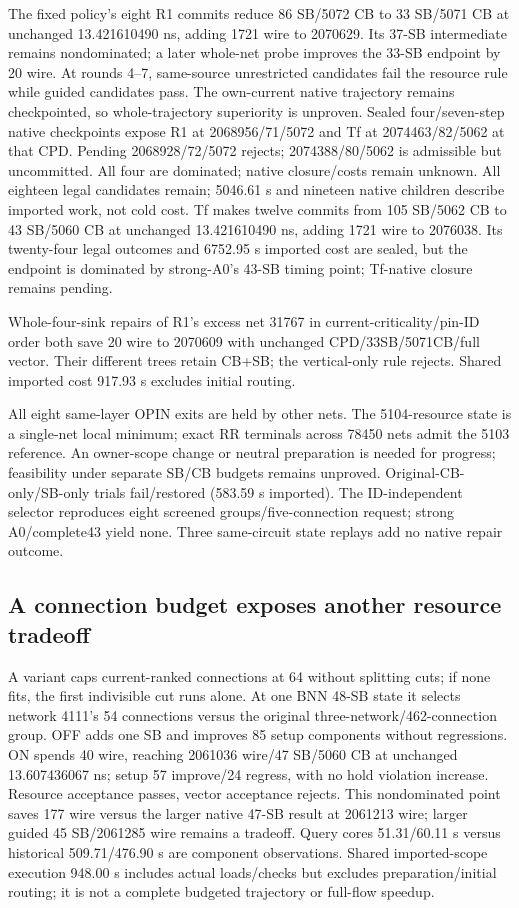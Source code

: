 \documentclass[conference,10pt]{IEEEtran}
\begin{document}
The fixed policy's eight R1 commits reduce 86 SB/5072 CB to 33 SB/5071 CB at unchanged 13.421610490 ns, adding 1721 wire to 2070629. Its 37-SB intermediate remains nondominated; a later whole-net probe improves the 33-SB endpoint by 20 wire. At rounds 4--7, same-source unrestricted candidates fail the resource rule while guided candidates pass. The own-current native trajectory remains checkpointed, so whole-trajectory superiority is unproven. Sealed four/seven-step native checkpoints expose R1 at 2068956/71/5072 and Tf at 2074463/82/5062 at that CPD. Pending 2068928/72/5072 rejects; 2074388/80/5062 is admissible but uncommitted. All four are dominated; native closure/costs remain unknown. All eighteen legal candidates remain; 5046.61 s and nineteen native children describe imported work, not cold cost. Tf makes twelve commits from 105 SB/5062 CB to 43 SB/5060 CB at unchanged 13.421610490 ns, adding 1721 wire to 2076038. Its twenty-four legal outcomes and 6752.95 s imported cost are sealed, but the endpoint is dominated by strong-A0's 43-SB timing point; Tf-native closure remains pending.

Whole-four-sink repairs of R1's excess net 31767 in current-criticality/pin-ID order both save 20 wire to 2070609 with unchanged CPD/33SB/5071CB/full vector. Their different trees retain CB+SB; the vertical-only rule rejects. Shared imported cost 917.93 s excludes initial routing.

All eight same-layer OPIN exits are held by other nets. The 5104-resource state is a single-net local minimum; exact RR terminals across 78450 nets admit the 5103 reference. An owner-scope change or neutral preparation is needed for progress; feasibility under separate SB/CB budgets remains unproved. Original-CB-only/SB-only trials fail/restored (583.59 s imported). The ID-independent selector reproduces eight screened groups/five-connection request; strong A0/complete43 yield none. Three same-circuit state replays add no native repair outcome.

\subsection{A connection budget exposes another resource tradeoff}
A variant caps current-ranked connections at 64 without splitting cuts; if none fits, the first indivisible cut runs alone. At one BNN 48-SB state it selects network 4111's 54 connections versus the original three-network/462-connection group. OFF adds one SB and improves 85 setup components without regressions. ON spends 40 wire, reaching 2061036 wire/47 SB/5060 CB at unchanged 13.607436067 ns; setup 57 improve/24 regress, with no hold violation increase. Resource acceptance passes, vector acceptance rejects. This nondominated point saves 177 wire versus the larger native 47-SB result at 2061213 wire; larger guided 45 SB/2061285 wire remains a tradeoff. Query cores 51.31/60.11 s versus historical 509.71/476.90 s are component observations. Shared imported-scope execution 948.00 s includes actual loads/checks but excludes preparation/initial routing; it is not a complete budgeted trajectory or full-flow speedup.
\end{document}
